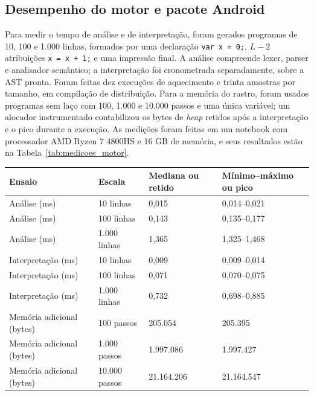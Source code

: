 \subsection{Desempenho do motor e pacote Android}
\label{sec:medicoes_pendentes}

Para medir o tempo de análise e de interpretação, foram gerados programas de 10,
100 e 1.000 linhas, formados por uma declaração \texttt{var x = 0;}, $L-2$
atribuições \texttt{x = x + 1;} e uma impressão final. A análise compreende lexer,
parser e analisador semântico; a interpretação foi cronometrada separadamente,
sobre a AST pronta. Foram feitas dez execuções de aquecimento e trinta amostras
por tamanho, em compilação de distribuição. Para a memória do rastro, foram
usados programas sem laço com 100, 1.000 e 10.000 passos e uma única variável; um
alocador instrumentado contabilizou os bytes de \textit{heap} retidos após a
interpretação e o pico durante a execução. As medições foram feitas em um
notebook com processador AMD Ryzen 7 4800HS e 16 GB de memória, e seus resultados
estão na Tabela~\ref{tab:medicoes_motor}.

\begin{table}[htb]
\centering
{}
\footnotesize
\begin{tabular}{P{4.3cm}P{2.2cm}P{3.0cm}P{3.2cm}}
\toprule
Ensaio & Escala & Mediana ou retido & Mínimo--máximo ou pico \\
\midrule
Análise (ms) & 10 linhas & 0,015 & 0,014--0,021 \\
Análise (ms) & 100 linhas & 0,143 & 0,135--0,177 \\
Análise (ms) & 1.000 linhas & 1,365 & 1,325--1,468 \\
Interpretação (ms) & 10 linhas & 0,009 & 0,009--0,014 \\
Interpretação (ms) & 100 linhas & 0,071 & 0,070--0,075 \\
Interpretação (ms) & 1.000 linhas & 0,732 & 0,698--0,885 \\
Memória adicional (bytes) & 100 passos & 205.054 & 205.395 \\
Memória adicional (bytes) & 1.000 passos & 1.997.086 & 1.997.427 \\
Memória adicional (bytes) & 10.000 passos & 21.164.206 & 21.164.547 \\
\bottomrule
\end{tabular}
\vspace{0.2cm}
\end{table}
\FloatBarrier

